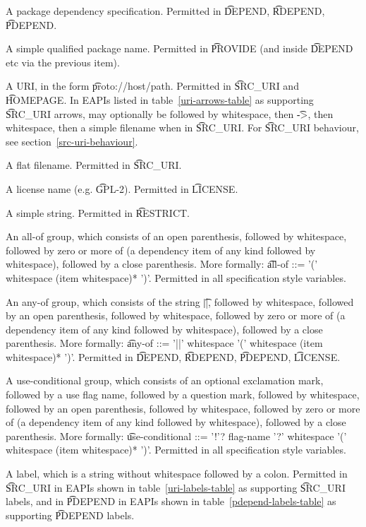 \begin{compactitem}
\item A package dependency specification. Permitted in \t{DEPEND}, \t{RDEPEND}, \t{PDEPEND}.
\item A simple qualified package name. Permitted in \t{PROVIDE} (and inside \t{DEPEND} etc
    via the previous item).
\item A URI, in the form \t{proto://host/path}. Permitted in \t{SRC\_URI} and \t{HOMEPAGE}.
In EAPIs listed in table~\ref{uri-arrows-table} as supporting \t{SRC\_URI} arrows, may
optionally be followed by whitespace, then \t{->}, then whitespace, then a simple filename
when in \t{SRC\_URI}. For \t{SRC\_URI} behaviour, see section~\ref{src-uri-behaviour}.
\item A flat filename. Permitted in \t{SRC\_URI}.
\item A license name (e.g. \t{GPL-2}). Permitted in \t{LICENSE}.
\item A simple string. Permitted in \t{RESTRICT}.
\item An all-of group, which consists of an open parenthesis, followed by whitespace,
    followed by zero or more of (a dependency item of any kind followed by whitespace), followed
    by a close parenthesis. More formally:
    \t{all-of ::= '(' whitespace (item whitespace)* ')'}. Permitted in all specification style
    variables.
\item An any-of group, which consists of the string \t{||}, followed by whitespace,
    followed by an open parenthesis, followed by whitespace, followed by zero or more
    of (a dependency item of any kind followed by whitespace), followed by a close parenthesis.
    More formally: \t{any-of ::= '||' whitespace '(' whitespace (item whitespace)* ')'}.
    Permitted in \t{DEPEND}, \t{RDEPEND}, \t{PDEPEND}, \t{LICENSE}.
\item A use-conditional group, which consists of an optional exclamation mark, followed by
    a use flag name, followed by a question mark, followed by whitespace, followed by
    an open parenthesis, followed by whitespace, followed by zero or more of (a dependency item
    of any kind followed by whitespace), followed by a close parenthesis. More formally:
    \t{use-conditional ::= '!'? flag-name '?' whitespace '(' whitespace (item whitespace)* ')'}.
    Permitted in all specification style variables.
\IFKDEBUILDELSE
{
    \item A label, which is a string without whitespace followed by a colon. Permitted in
    \t{SRC\_URI} in EAPIs shown in table~\ref{uri-labels-table} as supporting \t{SRC\_URI} labels,
    and in \t{PDEPEND} in EAPIs shown in table~\ref{pdepend-labels-table} as supporting \t{PDEPEND}
    labels.
}{
}
\end{compactitem}

